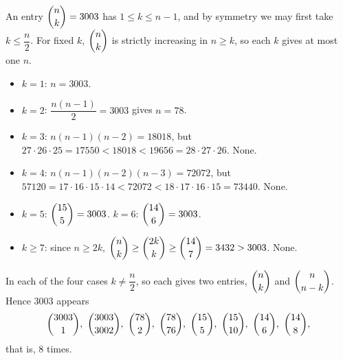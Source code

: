 An entry $\dbinom nk=3003$ has $1\le k\le n-1$, and by symmetry we may first take $k\le\dfrac n2$. For fixed $k$, $\dbinom nk$ is strictly increasing in $n\ge k$, so each $k$ gives at most one $n$.
\begin{itemize}
\item $k=1$: $n=3003$.
\item $k=2$: $\dfrac{n(n-1)}{2}=3003$ gives $n=78$.
\item $k=3$: $n(n-1)(n-2)=18018$, but $27\cdot26\cdot25=17550<18018<19656=28\cdot27\cdot26$. None.
\item $k=4$: $n(n-1)(n-2)(n-3)=72072$, but $57120=17\cdot16\cdot15\cdot14<72072<18\cdot17\cdot16\cdot15=73440$. None.
\item $k=5$: $\dbinom{15}{5}=3003$. \quad $k=6$: $\dbinom{14}{6}=3003$.
\item $k\ge7$: since $n\ge2k$, $\dbinom nk\ge\dbinom{2k}{k}\ge\dbinom{14}{7}=3432>3003$. None.
\end{itemize}
In each of the four cases $k\ne\dfrac n2$, so each gives two entries, $\dbinom nk$ and $\dbinom n{n-k}$. Hence $3003$ appears
\[\dbinom{3003}{1},\ \dbinom{3003}{3002},\ \dbinom{78}{2},\ \dbinom{78}{76},\ \dbinom{15}{5},\ \dbinom{15}{10},\ \dbinom{14}{6},\ \dbinom{14}{8},\]
that is, $\boxed{8}$ times.

